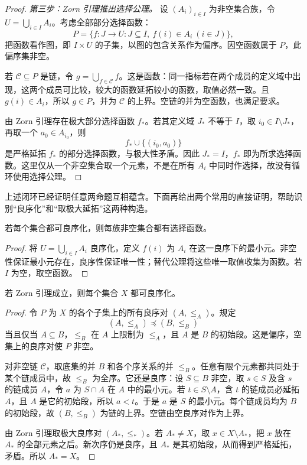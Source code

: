 \begin{proof}
\emph{第三步：Zorn 引理推出选择公理。}
设 $(A_i)_{i\in I}$ 为非空集合族，令 $U=\bigcup_{i\in I}A_i$。考虑全部部分选择函数：
\[
 P=\{f:J\to U:J\subseteq I,\ f(i)\in A_i\ (i\in J)\},
\]
把函数看作图，即 $I\times U$ 的子集，以图的包含关系作为偏序。因空函数属于 $P$，此偏序集非空。

若 $\mathcal C\subseteq P$ 是链，令 $g=\bigcup_{f\in\mathcal C}f$。这是函数：同一指标若在两个成员的定义域中出现，这两个成员可比较，较大的函数延拓较小的函数，取值必然一致。且 $g(i)\in A_i$，所以 $g\in P$，并为 $\mathcal C$ 的上界。空链的并为空函数，也满足要求。

由 Zorn 引理存在极大部分选择函数 $f_*$。若其定义域 $J_*$ 不等于 $I$，取 $i_0\in I\setminus J_*$，再取一个 $a_0\in A_{i_0}$，则
\[
 f_*\cup\{(i_0,a_0)\}
\]
是严格延拓 $f_*$ 的部分选择函数，与极大性矛盾。因此 $J_*=I$，$f_*$ 即为所求选择函数。这里仅从一个非空集合取一个元素，不是在所有 $A_i$ 中同时作选择，故没有循环使用选择公理。
\end{proof}

上述闭环已经证明任意两命题互相蕴含。下面再给出两个常用的直接证明，帮助识别“良序化”和“取极大延拓”这两种构造。

\begin{proposition}[良序原则直接推出选择公理]\label{prop:y0-wo-ac}
若每个集合都可良序化，则每族非空集合都有选择函数。
\end{proposition}
\begin{proof}
将 $U=\bigcup_{i\in I}A_i$ 良序化，定义 $f(i)$ 为 $A_i$ 在这一良序下的最小元。非空性保证最小元存在，良序性保证唯一性；替代公理将这些唯一取值收集为函数。若 $I$ 为空，取空函数。
\end{proof}

\begin{proposition}\label{prop:y0-zorn-wo}
若 Zorn 引理成立，则每个集合 $X$ 都可良序化。
\end{proposition}
\begin{proof}
令 $P$ 为 $X$ 的各个子集上的所有良序对 $(A,\le_A)$。规定
\[
 (A,\le_A)\preccurlyeq(B,\le_B)
\]
当且仅当 $A\subseteq B$，$\le_B$ 在 $A$ 上限制为 $\le_A$，且 $A$ 是 $B$ 的初始段。这是偏序，空集上的良序对使 $P$ 非空。

对非空链 $\mathcal C$，取底集的并 $B$ 和各个序关系的并 $\le_B$。任意有限个元素都共同处于某个链成员中，故 $\le_B$ 为全序。它还是良序：设 $S\subseteq B$ 非空，取 $s\in S$ 及含 $s$ 的链成员 $A$，令 $a$ 为 $S\cap A$ 在 $A$ 中的最小元。若 $t\in S\setminus A$，含 $t$ 的链成员必延拓 $A$，且 $A$ 是它的初始段，所以 $a<t$。于是 $a$ 是 $S$ 的最小元。每个链成员均为 $B$ 的初始段，故 $(B,\le_B)$ 为链的上界。空链由空良序对作为上界。

由 Zorn 引理取极大良序对 $(A_*,\le_*)$。若 $A_*\ne X$，取 $x\in X\setminus A_*$，把 $x$ 放在 $A_*$ 的全部元素之后。新次序仍是良序，且 $A_*$ 是其初始段，从而得到严格延拓，矛盾。所以 $A_*=X$。
\end{proof}

